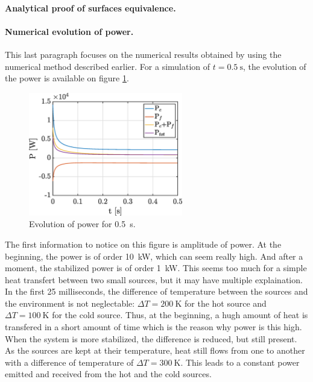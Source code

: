 \documentclass[a4paper,12pt,twoside]{article}
\begin{document}
\paragraph{Analytical proof of surfaces equivalence.}

\paragraph{Numerical evolution of power.}
This last paragraph focuses on the numerical results obtained by using the numerical method described earlier.
For a simulation of $t=\SI{0.5}{\s}$, the evolution of the power is available on figure \ref{fig:d-power}.

\begin{figure}[h]
  \centering
  \includegraphics[width=0.6\textwidth]{graphs/d_power.eps}
  \caption{Evolution of power for \SI{0.5}{\s}.}
  \label{fig:d-power}
\end{figure}

The first information to notice on this figure is amplitude of power.
At the beginning, the power is of order \SI{10}{\kilo\watt}, which can seem really high.
And after a moment, the stabilized power is of order \SI{1}{\kilo\watt}.
This seems too much for a simple heat transfert between two small sources, but it may have multiple explaination.
In the first \num{25} milliseconds, the difference of temperature between the sources and the environment is not neglectable: $\Delta T=\SI{200}{\kelvin}$ for the hot source and $\Delta T=\SI{100}{\kelvin}$ for the cold source.
Thus, at the beginning, a hugh amount of heat is transfered in a short amount of time which is the reason why power is this high.
When the system is more stabilized, the difference is reduced, but still present.
As the sources are kept at their temperature, heat still flows from one to another with a difference of temperature of $\Delta T=\SI{300}{\kelvin}$.
This leads to a constant power emitted and received from the hot and the cold sources.\\
\end{document}
